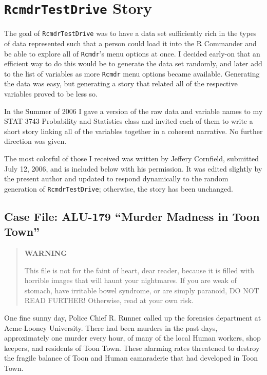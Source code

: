\documentclass[captions=tableheading]{scrbook}
\begin{document}
\chapter{\texttt{RcmdrTestDrive} Story}
\label{sec-9}

\label{cha:RcmdrTestDrive-Story}

The goal of \texttt{RcmdrTestDrive} was to have a data set sufficiently rich in the types of data represented such that a person could load it into the \textsf{R} Commander and be able to explore all of \texttt{Rcmdr}'s menu options at once. I decided early-on that an efficient way to do this would be to generate the data set randomly, and later add to the list of variables as more \texttt{Rcmdr} menu options became available. Generating the data was easy, but generating a story that related all of the respective variables proved to be less so.

In the Summer of 2006 I gave a version of the raw data and variable names to my STAT 3743 Probability and Statistics class and invited each of them to write a short story linking all of the variables together in a coherent narrative. No further direction was given. 

The most colorful of those I received was written by Jeffery Cornfield, submitted July 12, 2006, and is included below with his permission. It was edited slightly by the present author and updated to respond dynamically to the random generation of \texttt{RcmdrTestDrive}; otherwise, the story has been unchanged. 
\section{Case File: ALU-179 ``Murder Madness in Toon Town”}
\label{sec-9-1}

\begin{quote}
\noindent \begin{center}
\textbf{WARNING} 
\par\end{center}
\noindent This file is not for the faint of heart, dear reader, because it is filled with horrible images that will haunt your nightmares. If you are weak of stomach, have irritable bowel syndrome, or are simply paranoid, DO NOT READ FURTHER! Otherwise, read at your own risk.
\end{quote}

One fine sunny day, Police Chief R. Runner called up the forensics department at Acme-Looney University. There had been 
 murders in the past 
 days, approximately one murder every hour, of many of the local Human workers, shop keepers, and residents of Toon Town. These alarming rates threatened to destroy the fragile balance of Toon and Human camaraderie that had developed in Toon Town. 
\end{document}
